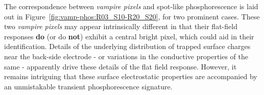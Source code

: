 

The correspondence between {\it vampire pixels} and spot-like phosphorescence is laid out in Figure~\ref{fig:vamp-phos:R03_S10-R20_S20}, for two prominent cases.  These two {\it vampire pixels} may appear intrinsically different in that their flat-field responses {\bf do} (or do {\bf not}) exhibit a central bright pixel, which could aid in their identification. Details of the underlying distribution of trapped surface charges near the back-side electrode - or variations in the conductive properties of the same - apparently drive these details of the flat field response. However, it remains intriguing that these surface electrostatic properties are accompanied by an unmistakable transient phosphorescence signature.




